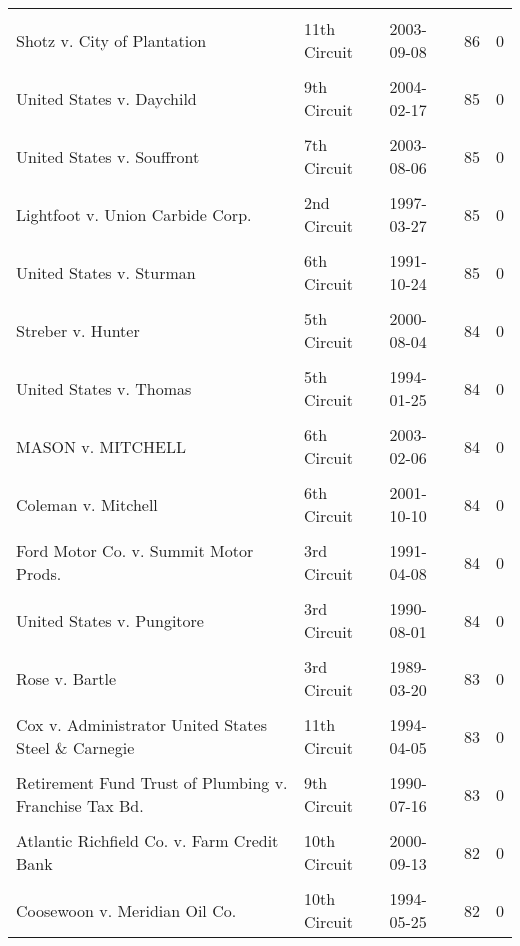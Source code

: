 \documentclass[10pt, letterpaper]{article}
\begin{document}
\begin{spacing}{1.0}
\begin{footnotesize}
\begin{longtable}[H]{p{3.5in}llrr}
& & & &\\[-6pt]
Shotz v. City of Plantation & 11th Circuit & 2003-09-08 & 86 & 0\\
& & & &\\[-6pt]
United States v. Daychild & 9th Circuit & 2004-02-17 & 85 & 0\\
& & & &\\[-6pt]
United States v. Souffront & 7th Circuit & 2003-08-06 & 85 & 0\\
& & & &\\[-6pt]
Lightfoot v. Union Carbide Corp. & 2nd Circuit & 1997-03-27 & 85 & 0\\
& & & &\\[-6pt]
United States v. Sturman & 6th Circuit & 1991-10-24 & 85 & 0\\
& & & &\\[-6pt]
Streber v. Hunter & 5th Circuit & 2000-08-04 & 84 & 0\\
& & & &\\[-6pt]
United States v. Thomas & 5th Circuit & 1994-01-25 & 84 & 0\\
& & & &\\[-6pt]
MASON v. MITCHELL & 6th Circuit & 2003-02-06 & 84 & 0\\
& & & &\\[-6pt]
Coleman v. Mitchell & 6th Circuit & 2001-10-10 & 84 & 0\\
& & & &\\[-6pt]
Ford Motor Co. v. Summit Motor Prods. & 3rd Circuit & 1991-04-08 & 84 & 0\\
& & & &\\[-6pt]
United States v. Pungitore & 3rd Circuit & 1990-08-01 & 84 & 0\\
& & & &\\[-6pt]
Rose v. Bartle & 3rd Circuit & 1989-03-20 & 83 & 0\\
& & & &\\[-6pt]
Cox v. Administrator United States Steel \& Carnegie & 11th Circuit & 1994-04-05 & 83 & 0\\
& & & &\\[-6pt]
Retirement Fund Trust of Plumbing v. Franchise Tax Bd. & 9th Circuit & 1990-07-16 & 83 & 0\\
& & & &\\[-6pt]
Atlantic Richfield Co. v. Farm Credit Bank & 10th Circuit & 2000-09-13 & 82 & 0\\
& & & &\\[-6pt]
Coosewoon v. Meridian Oil Co. & 10th Circuit & 1994-05-25 & 82 & 0\\

\end{longtable}
\end{footnotesize}
\end{spacing}
\end{document}
